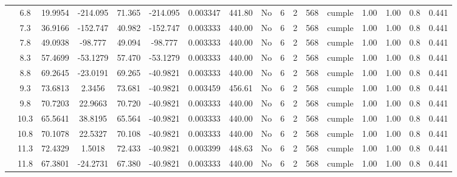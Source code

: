 \begin{table}[H]
{\begin{tabular}{|c|c|c|c|c|c|c|c|c|c|c|c|c|c|c|c|c|}
\cline{2-17}        & \cellcolor[rgb]{ .851,  .882,  .949}6.8 & 19.9954 & -214.095 & 71.365 & -214.095 & 0.003347 & 441.80 & No  & 6   & 2   & 568 & \cellcolor[rgb]{ .776,  .937,  .808}cumple & 1.00 & 1.00 & 0.8 & 0.441 \bigstrut\\
\cline{2-17}        & 7.3 & 36.9166 & -152.747 & 40.982 & -152.747 & 0.003333 & 440.00 & No  & 6   & 2   & 568 & \cellcolor[rgb]{ .776,  .937,  .808}cumple & 1.00 & 1.00 & 0.8 & 0.441 \bigstrut\\
\cline{2-17}        & 7.8 & 49.0938 & -98.777 & 49.094 & -98.777 & 0.003333 & 440.00 & No  & 6   & 2   & 568 & \cellcolor[rgb]{ .776,  .937,  .808}cumple & 1.00 & 1.00 & 0.8 & 0.441 \bigstrut\\
\cline{2-17}        & 8.3 & 57.4699 & -53.1279 & 57.470 & -53.1279 & 0.003333 & 440.00 & No  & 6   & 2   & 568 & \cellcolor[rgb]{ .776,  .937,  .808}cumple & 1.00 & 1.00 & 0.8 & 0.441 \bigstrut\\
\cline{2-17}        & 8.8 & 69.2645 & -23.0191 & 69.265 & -40.9821 & 0.003333 & 440.00 & No  & 6   & 2   & 568 & \cellcolor[rgb]{ .776,  .937,  .808}cumple & 1.00 & 1.00 & 0.8 & 0.441 \bigstrut\\
\cline{2-17}        & 9.3 & 73.6813 & 2.3456 & 73.681 & -40.9821 & 0.003459 & 456.61 & No  & 6   & 2   & 568 & \cellcolor[rgb]{ .776,  .937,  .808}cumple & 1.00 & 1.00 & 0.8 & 0.441 \bigstrut\\
\cline{2-17}        & 9.8 & 70.7203 & 22.9663 & 70.720 & -40.9821 & 0.003333 & 440.00 & No  & 6   & 2   & 568 & \cellcolor[rgb]{ .776,  .937,  .808}cumple & 1.00 & 1.00 & 0.8 & 0.441 \bigstrut\\
\cline{2-17}        & 10.3 & 65.5641 & 38.8195 & 65.564 & -40.9821 & 0.003333 & 440.00 & No  & 6   & 2   & 568 & \cellcolor[rgb]{ .776,  .937,  .808}cumple & 1.00 & 1.00 & 0.8 & 0.441 \bigstrut\\
\cline{2-17}        & 10.8 & 70.1078 & 22.5327 & 70.108 & -40.9821 & 0.003333 & 440.00 & No  & 6   & 2   & 568 & \cellcolor[rgb]{ .776,  .937,  .808}cumple & 1.00 & 1.00 & 0.8 & 0.441 \bigstrut\\
\cline{2-17}        & 11.3 & 72.4329 & 1.5018 & 72.433 & -40.9821 & 0.003399 & 448.63 & No  & 6   & 2   & 568 & \cellcolor[rgb]{ .776,  .937,  .808}cumple & 1.00 & 1.00 & 0.8 & 0.441 \bigstrut\\
\cline{2-17}        & 11.8 & 67.3801 & -24.2731 & 67.380 & -40.9821 & 0.003333 & 440.00 & No  & 6   & 2   & 568 & \cellcolor[rgb]{ .776,  .937,  .808}cumple & 1.00 & 1.00 & 0.8 & 0.441 \bigstrut\\

\end{tabular}}
\end{table}
